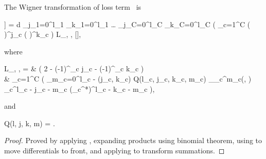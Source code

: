 \begin{theorem}
\label{thm:transformations:w-losses}
    The Wigner transformation of loss term~ is
	\begin{eqn*}
\fl		{} \left[ \int d\xvec \hat{\mathcal{L}}_{\lvec} [\hat{A}] \right]
		= \int d\xvec
			\sum_{j_1=0}^{l_1} \sum_{k_1=0}^{l_1} \ldots
			\sum_{j_C=0}^{l_C} \sum_{k_C=0}^{l_C}
				\left(
					\prod_{c=1}^C
						\left(  \right)^{j_c}
						\left(  \right)^{k_c}
				\right)
				L_{\lvec, \jvec, \kvec}
			,
	\end{eqn*}
	where
    \begin{eqn*}
\fl		L_{\lvec, \jvec, \kvec}
    	={} & \left( 2 - (-1)^{\sum_c j_c} - (-1)^{\sum_c k_c} \right) \\
    	&	\prod_{c=1}^C \left(
    			\sum_{m_c=0}^{l_c - \max(j_c, k_c)}
    			Q(l_c, j_c, k_c, m_c)
    			\delta_{\restbasis_c}^{m_c}(\xvec, \xvec)
    			\Psi_c^{l_c - j_c - m_c}
    			(\Psi_c^*)^{l_c - k_c - m_c}
    		\right),
    \end{eqn*}
    and
    \begin{eqn*}
		Q(l, j, k, m)
    	= 
    		.
    \end{eqn*}
\end{theorem}
\begin{proof}
Proved by applying , expanding products using binomial theorem, using  to move differentials to front, and applying  to transform summations.
\end{proof}
